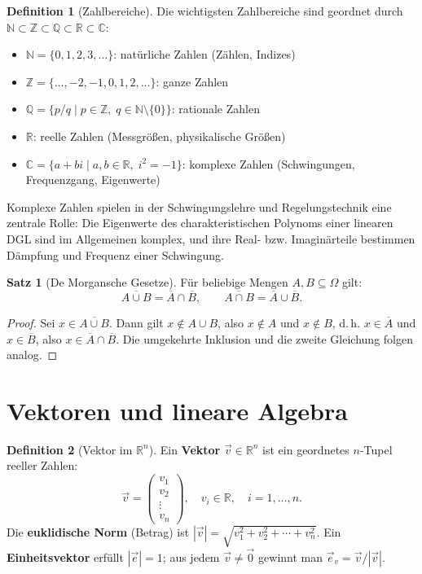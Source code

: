 ﻿\documentclass[a4paper,12pt]{report}
\theoremstyle{definition}
\newtheorem{definition}{Definition}
\newtheorem{satz}{Satz}
\begin{document}
\begin{definition}[Zahlbereiche]
Die wichtigsten Zahlbereiche sind geordnet durch $\mathbb{N} \subset \mathbb{Z} \subset \mathbb{Q} \subset \mathbb{R} \subset \mathbb{C}$:
\begin{itemize}
    \item[-] $\mathbb{N} = \{0, 1, 2, 3, \ldots\}$: nat\"urliche Zahlen (Z\"ahlen, Indizes)
    \item[-] $\mathbb{Z} = \{\ldots, -2, -1, 0, 1, 2, \ldots\}$: ganze Zahlen
    \item[-] $\mathbb{Q} = \{p/q \mid p \in \mathbb{Z},\; q \in \mathbb{N} \setminus \{0\}\}$: rationale Zahlen
    \item[-] $\mathbb{R}$: reelle Zahlen (Messgr\"o\ss{}en, physikalische Gr\"o\ss{}en)
    \item[-] $\mathbb{C} = \{a + bi \mid a, b \in \mathbb{R},\; i^2 = -1\}$: komplexe Zahlen
          (Schwingungen, Frequenzgang, Eigenwerte)
\end{itemize}
\end{definition}

Komplexe Zahlen spielen in der Schwingungslehre und Regelungstechnik
eine zentrale Rolle: Die Eigenwerte des charakteristischen Polynoms einer
linearen DGL sind im Allgemeinen komplex, und ihre Real- bzw. Imagin\"arteile
bestimmen D\"ampfung und Frequenz einer Schwingung.

\begin{satz}[De Morgansche Gesetze]
F\"ur beliebige Mengen $A, B \subseteq \Omega$ gilt:
\[
  \overline{A \cup B} = \overline{A} \cap \overline{B},
  \qquad
  \overline{A \cap B} = \overline{A} \cup \overline{B}.
\]
\end{satz}
\begin{proof}
Sei $x \in \overline{A \cup B}$. Dann gilt $x \notin A \cup B$,
also $x \notin A$ und $x \notin B$, d.\,h. $x \in \overline{A}$
und $x \in \overline{B}$, also $x \in \overline{A} \cap \overline{B}$.
Die umgekehrte Inklusion und die zweite Gleichung folgen analog.
\end{proof}

\section{Vektoren und lineare Algebra}

\begin{definition}[Vektor im $\mathbb{R}^n$]
Ein \textbf{Vektor} $\vec{v} \in \mathbb{R}^n$ ist ein geordnetes $n$-Tupel
reeller Zahlen:
\[
  \vec{v} = \begin{pmatrix} v_1 \\ v_2 \\ \vdots \\ v_n \end{pmatrix},
  \quad v_i \in \mathbb{R}, \quad i = 1, \ldots, n.
\]
Die \textbf{euklidische Norm} (Betrag) ist
$|\vec{v}| = \sqrt{v_1^2 + v_2^2 + \cdots + v_n^2}$.
Ein \textbf{Einheitsvektor} erf\"ullt $|\vec{e}| = 1$;
aus jedem $\vec{v} \neq \vec{0}$ gewinnt man $\vec{e}_v = \vec{v}/|\vec{v}|$.
\end{definition}
\end{document}

